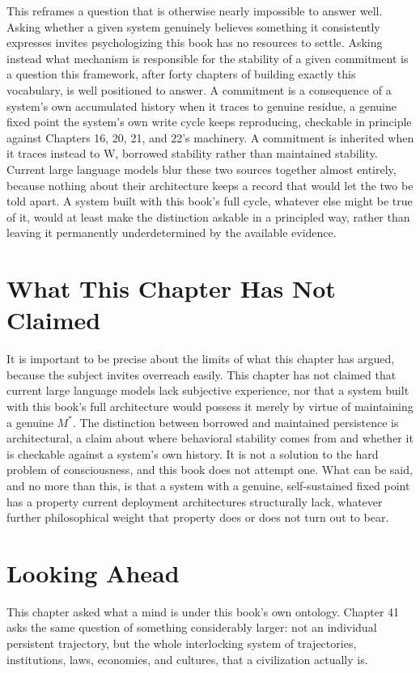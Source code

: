 This reframes a question that is otherwise nearly impossible to answer well. Asking whether a given system genuinely believes something it consistently expresses invites psychologizing this book has no resources to settle. Asking instead what mechanism is responsible for the stability of a given commitment is a question this framework, after forty chapters of building exactly this vocabulary, is well positioned to answer. A commitment is a consequence of a system's own accumulated history when it traces to genuine residue, a genuine fixed point the system's own write cycle keeps reproducing, checkable in principle against Chapters 16, 20, 21, and 22's machinery. A commitment is inherited when it traces instead to W, borrowed stability rather than maintained stability. Current large language models blur these two sources together almost entirely, because nothing about their architecture keeps a record that would let the two be told apart. A system built with this book's full cycle, whatever else might be true of it, would at least make the distinction askable in a principled way, rather than leaving it permanently underdetermined by the available evidence.

\section{What This Chapter Has Not Claimed}

It is important to be precise about the limits of what this chapter has argued, because the subject invites overreach easily. This chapter has not claimed that current large language models lack subjective experience, nor that a system built with this book's full architecture would possess it merely by virtue of maintaining a genuine \(M^*\). The distinction between borrowed and maintained persistence is architectural, a claim about where behavioral stability comes from and whether it is checkable against a system's own history. It is not a solution to the hard problem of consciousness, and this book does not attempt one. What can be said, and no more than this, is that a system with a genuine, self-sustained fixed point has a property current deployment architectures structurally lack, whatever further philosophical weight that property does or does not turn out to bear.

\section{Looking Ahead}

This chapter asked what a mind is under this book's own ontology. Chapter 41 asks the same question of something considerably larger: not an individual persistent trajectory, but the whole interlocking system of trajectories, institutions, laws, economies, and cultures, that a civilization actually is.
